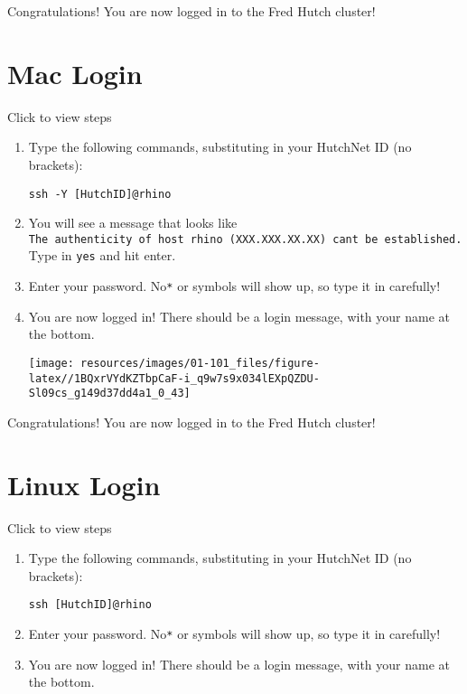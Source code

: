 \documentclass[
]{book}
\begin{document}
Congratulations! You are now logged in to the Fred Hutch cluster!

\hypertarget{mac-login}{%
\section{Mac Login}\label{mac-login}}

Click to view steps

\begin{enumerate}
\def\labelenumi{\arabic{enumi}.}
\item
  Type the following commands, substituting in your HutchNet ID (no brackets):

\begin{verbatim}
ssh -Y [HutchID]@rhino
\end{verbatim}
\item
  You will see a message that looks like \texttt{The\ authenticity\ of\ host\ \textquotesingle{}rhino\ (XXX.XXX.XX.XX)\textquotesingle{}\ can\textquotesingle{}t\ be\ established.} Type in \texttt{yes} and hit enter.
\item
  Enter your password. No\texttt{*} or symbols will show up, so type it in carefully!
\item
  You are now logged in! There should be a login message, with your name at the bottom.

  \texttt{[image: resources/images/01-101\_files/figure-latex//1BQxrVYdKZTbpCaF-i\_q9w7s9x034lEXpQZDU-Sl09cs\_g149d37dd4a1\_0\_43]}
\end{enumerate}

Congratulations! You are now logged in to the Fred Hutch cluster!

\hypertarget{linux-login}{%
\section{Linux Login}\label{linux-login}}

Click to view steps

\begin{enumerate}
\def\labelenumi{\arabic{enumi}.}
\item
  Type the following commands, substituting in your HutchNet ID (no brackets):

\begin{verbatim}
ssh [HutchID]@rhino
\end{verbatim}
\item
  Enter your password. No\texttt{*} or symbols will show up, so type it in carefully!\\
\item
  You are now logged in! There should be a login message, with your name at the bottom.
\end{enumerate}
\end{document}
